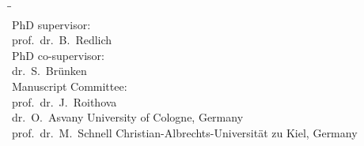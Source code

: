 \begin{titlepage}
\begin{center}
    \end{center}
    \clearpage

    \thispagestyle{empty}

    \begin{tabbing}
        \hspace{\tabcolsep}\=\hspace{0.33\textwidth}\=\hspace{0.66\textwidth}\\[-3\medskipamount]

        \> PhD supervisor:\\[\smallskipamount]
        \> prof.\ dr.\ B.\ Redlich\\[\bigskipamount]
        
        \> PhD co-supervisor:\\[\smallskipamount]
        \> dr.\ S.\ Brünken\\[\bigskipamount]
        
        \> Manuscript Committee: \\[\smallskipamount]
        \> prof.\ dr.\ J.\ Roithova\\
        \> dr.\ O.\ Asvany \> University of Cologne, Germany\\
        \> prof.\ dr.\ M.\ Schnell \> Christian-Albrechts-Universit\"{a}t zu Kiel, Germany\\[\medskipamount]
    \end{tabbing}

\end{titlepage}
\cleardoublepage
